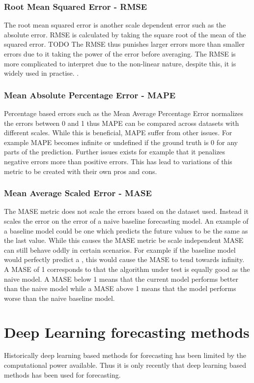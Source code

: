 \subsubsection{Root Mean Squared Error - RMSE}
The root mean squared error is another scale dependent error such as the absolute error. RMSE is calculated by taking the square root of the mean of the squared error. TODO The RMSE thus punishes larger errors more than smaller errors due to it taking the power of the error before averaging. The RMSE is more complicated to interpret due to the non-linear nature, despite this, it is widely used in practise. \cite{hyndman_forecasting_nodate}.

\subsubsection{Mean Absolute Percentage Error - MAPE}
Percentage based errors such as the Mean Average Percentage Error normalizes the errors between 0 and 1 thus MAPE can be compared across datasets with different scales. While this is beneficial, MAPE suffer from other issues. For example MAPE becomes infinite or undefined if the ground truth is 0 for any parts of the prediction. Further issues exists for example that it penalizes negative errors more than positive errors. This has lead to variations of this metric to be created with their own pros and cons. \cite{hyndman_forecasting_nodate}

\subsubsection{Mean Average Scaled Error - MASE}
The MASE metric does not scale the errors based on the dataset used. Instead it scales the error on the error of a naive baseline forecasting model. An example of a baseline model could be one which predicts the future values to be the same as the last value. While this causes the MASE metric be scale independent MASE can still behave oddly in certain scenarios. For example if the  baseline model would perfectly predict a , this would cause the MASE to tend towards infinity. A MASE of 1 corresponds to that the algorithm under test is equally good as the naive model. A MASE below 1 means that the current model performs better than the naive model while a MASE above 1 means that the model performs worse than the naive baseline model. \cite{hyndman_forecasting_nodate}

\section{Deep Learning forecasting methods}
\label{subsec:deep_learning_methods}
Historically deep learning based methods for forecasting has been limited by the computational power available. Thus it is only recently that deep learning based methods has been used for forecasting.

